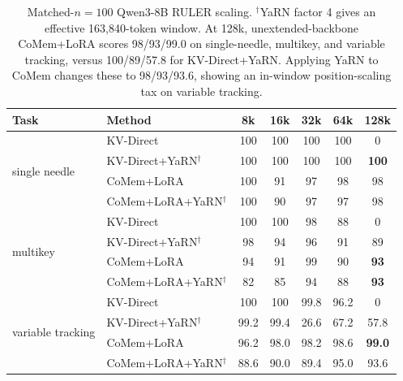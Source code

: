 \begin{table}[t]
\centering
\small
\setlength{\tabcolsep}{3.8pt}
\begin{tabular}{@{}llccccc@{}}
\toprule
\textbf{Task} & \textbf{Method} & \textbf{8k} & \textbf{16k} & \textbf{32k} & \textbf{64k} & \textbf{128k} \\
\midrule
\multirow{4}{*}{single needle}
& KV-Direct & 100 & 100 & 100 & 100 & 0 \\
& KV-Direct+YaRN$^\dagger$ & 100 & 100 & 100 & 100 & \textbf{100} \\
& CoMem+LoRA & 100 & 91 & 97 & 98 & 98 \\
& CoMem+LoRA+YaRN$^\dagger$ & 100 & 90 & 97 & 97 & 98 \\
\midrule
\multirow{4}{*}{multikey}
& KV-Direct & 100 & 100 & 98 & 88 & 0 \\
& KV-Direct+YaRN$^\dagger$ & 98 & 94 & 96 & 91 & 89 \\
& CoMem+LoRA & 94 & 91 & 99 & 90 & \textbf{93} \\
& CoMem+LoRA+YaRN$^\dagger$ & 82 & 85 & 94 & 88 & \textbf{93} \\
\midrule
\multirow{4}{*}{variable tracking}
& KV-Direct & 100 & 100 & 99.8 & 96.2 & 0 \\
& KV-Direct+YaRN$^\dagger$ & 99.2 & 99.4 & 26.6 & 67.2 & 57.8 \\
& CoMem+LoRA & 96.2 & 98.0 & 98.2 & 98.6 & \textbf{99.0} \\
& CoMem+LoRA+YaRN$^\dagger$ & 88.6 & 90.0 & 89.4 & 95.0 & 93.6 \\
\bottomrule
\end{tabular}
\caption{Matched-$n{=}100$ Qwen3-8B RULER scaling. $^\dagger$YaRN factor 4
gives an effective 163,840-token window. At 128k, unextended-backbone CoMem+LoRA scores
98/93/99.0 on single-needle, multikey, and variable tracking, versus
100/89/57.8 for KV-Direct+YaRN. Applying YaRN to CoMem changes these to
98/93/93.6, showing an in-window position-scaling tax on variable tracking.}
\label{tab:scaling}
\end{table}
